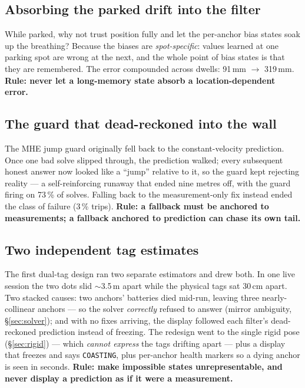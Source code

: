 \documentclass[11pt,a4paper]{article}
\newcommand{\code}[1]{\texttt{#1}}
\begin{document}
\subsection{Absorbing the parked drift into the filter}
\label{sec:fail-inversion}
While parked, why not trust position fully and let the per-anchor bias states soak
up the breathing? Because the biases are \emph{spot-specific}: values learned at
one parking spot are wrong at the next, and the whole point of bias states is that
they are remembered. The error compounded across dwells: 91\,mm $\to$ 319\,mm.
\textbf{Rule: never let a long-memory state absorb a location-dependent error.}

\subsection{The guard that dead-reckoned into the wall}
\label{sec:fail-guard}
The MHE jump guard originally fell back to the constant-velocity prediction. Once
one bad solve slipped through, the prediction walked; every subsequent honest
answer now looked like a ``jump'' relative to it, so the guard kept rejecting
reality --- a self-reinforcing runaway that ended nine metres off, with the guard
firing on 73\,\% of solves. Falling back to the measurement-only fix instead ended
the class of failure (3\,\% trips). \textbf{Rule: a fallback must be anchored to
measurements; a fallback anchored to prediction can chase its own tail.}

\subsection{Two independent tag estimates}
\label{sec:fail-dualtag}
The first dual-tag design ran two separate estimators and drew both. In one live
session the two dots slid $\sim$3.5\,m apart while the physical tags sat 30\,cm
apart. Two stacked causes: two anchors' batteries died mid-run, leaving three
nearly-collinear anchors --- so the solver \emph{correctly} refused to answer
(mirror ambiguity, \S\ref{sec:solver}); and with no fixes arriving, the display
followed each filter's dead-reckoned prediction instead of freezing. The redesign
went to the single rigid pose (\S\ref{sec:rigid}) --- which \emph{cannot express}
the tags drifting apart --- plus a display that freezes and says
\code{COASTING}, plus per-anchor health markers so a dying anchor is seen in
seconds. \textbf{Rule: make impossible states unrepresentable, and never display a
prediction as if it were a measurement.}
\end{document}
